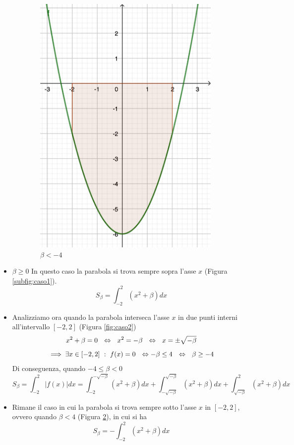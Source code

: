 \documentclass{article}
\begin{document}
\begin{enumerate}[label=\textbf{Esercizio 11.\arabic*.},itemindent=*]
\begin{figure}[h]
\begin{subfigure}{0.27\textwidth}
        \includegraphics[width=.9\textwidth]{src/caso3.png}
        \caption{$\beta<-4$}
        \label{fig:caso3}
    \end{subfigure}
    \caption{}
\end{figure}
\begin{itemize}
    \item $\beta\geq0$ In questo caso la parabola si trova sempre sopra l'asse $x$ (Figura \ref{subfig:caso1}). \[S_\beta=\int_{-2}^2(x^2+\beta)dx\]
    \item Analizziamo ora quando la parabola interseca l'asse $x$ in due punti interni all'intervallo $[-2,2]$ (Figura \ref{fig:caso2})
    \[x^2+\beta=0~~\Leftrightarrow~~x^2=-\beta~~\Leftrightarrow~~x=\pm\sqrt{-\beta}\]
    \[\implies \exists x \in [-2,2]~:~f(x)=0~~\Leftrightarrow -\beta\leq 4~~\Leftrightarrow~~\beta\geq -4\]
    Di conseguenza, quando $-4\leq \beta<0$
    \[S_\beta=\int_{-2}^{2}|f(x)|dx=\int_{-2}^{-\sqrt{-\beta}}(x^2+\beta)dx+\int_{-\sqrt{-\beta}}^{\sqrt{-\beta}}(x^2+\beta)dx+\int_{\sqrt{-\beta}}^{2}(x^2+\beta)dx\]
    \item Rimane il caso in cui la parabola si trova sempre sotto l'asse $x$ in $[-2,2]$, ovvero quando $\beta<4$ (Figura \ref{fig:caso3}), in cui si ha
    \[S_\beta=-\int_{-2}^2(x^2+\beta)dx\]
\end{itemize}


\end{enumerate}
\end{document}
